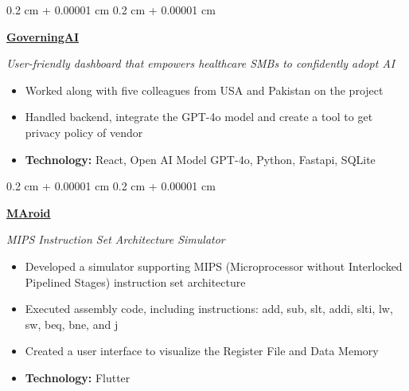 \documentclass[10pt, letterpaper]{article}
\newenvironment{highlights}{
    \begin{itemize}[
        topsep=0.10 cm,
        parsep=0.10 cm,
        partopsep=0pt,
        itemsep=0pt,
        leftmargin=0.4 cm + 10pt
    ]
}{
    \end{itemize}
} %
\newenvironment{onecolentry}{
    \begin{adjustwidth}{
        0.2 cm + 0.00001 cm
    }{
        0.2 cm + 0.00001 cm
    }
}{
    \end{adjustwidth}
} %
\let\hrefWithoutArrow\href
\renewcommand{\href}[2]{\hrefWithoutArrow{#1}{\ifthenelse{\equal{#2}{}}{ }{#2 }\raisebox{.15ex}{\footnotesize \faExternalLink*}}}
\begin{document}
        \begin{onecolentry}
            \mbox{\hrefWithoutArrow{https://github.com/Hassu083/governing-ai}{{}\hspace*{0.0cm}\textbf{GoverningAI}}}


            \textit{User-friendly dashboard that empowers healthcare SMBs to confidently adopt AI}
            \begin{highlights}
                \item Worked along with five colleagues from USA and Pakistan on the project
                \item Handled backend, integrate the GPT-4o model and create a tool to get privacy policy of vendor
                \item \textbf{Technology:} React, Open AI Model GPT-4o, Python, Fastapi, SQLite

            \end{highlights}
        \end{onecolentry}


        \vspace{0.2 cm}


        \begin{onecolentry}
            \mbox{\hrefWithoutArrow{https://github.com/Hassu083/MAROID}{{}\hspace*{0.0cm}\textbf{MAroid}}}

            \textit{MIPS Instruction Set Architecture Simulator}
            \begin{highlights}
                \item Developed a simulator supporting MIPS (Microprocessor without Interlocked Pipelined Stages) instruction set architecture
                \item Executed assembly code, including instructions: add, sub, slt, addi, slti, lw, sw, beq, bne, and j
                \item Created a user interface to visualize the Register File and Data Memory
                \item \textbf{Technology:} Flutter

            \end{highlights}
        \end{onecolentry}


        \vspace{0.2 cm}
\end{document}
